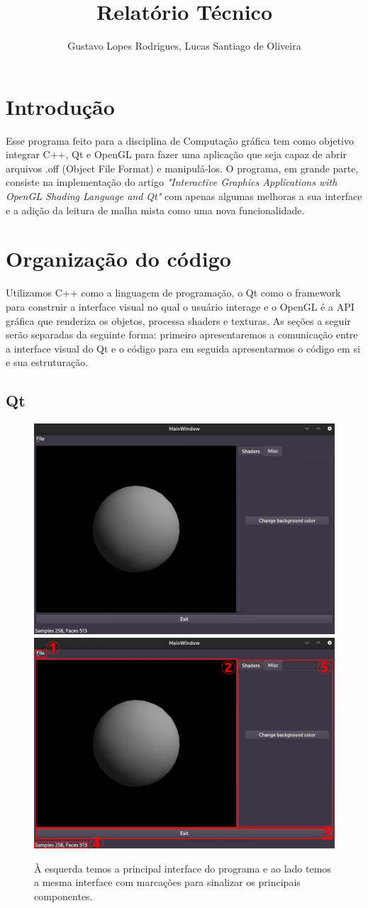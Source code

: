 \documentclass{ol-softwaremanual}
\title{Relatório Técnico }
\author{Gustavo Lopes Rodrigues, Lucas Santiago de Oliveira}
\begin{document}
\maketitle

\tableofcontents
\newpage

\section{Introdução}

Esse programa feito para a disciplina de Computação gráfica tem como objetivo integrar
C++, Qt e OpenGL para fazer uma aplicação que seja capaz de abrir arquivos .off (Object File Format)
e manipulá-los. O programa, em grande parte, consiste na implementação do artigo 
\emph{"Interactive Graphics Applications with OpenGL Shading Language and Qt"} com apenas algumas 
melhoras a sua interface e a adição da leitura de malha mista como uma nova funcionalidade.

\section{Organização do código}

Utilizamos C++ como a linguagem de programação, o Qt como o framework para 
construir a interface visual no qual o usuário interage e o OpenGL é a API gráfica que renderiza
os objetos, processa shaders e texturas. As seções a seguir serão separadas da seguinte forma: primeiro
apresentaremos a comunicação entre a interface visual do Qt e o código para em seguida apresentarmos o código 
em si e sua estruturação.

\subsection{Qt}

\begin{figure}[ht]
    \centering
    \includegraphics[width=.4\textwidth]{Interface.jpg}
    \includegraphics[width=.4\textwidth]{Interfacemarcada.jpg}
    \caption{À esquerda temos a principal interface do programa e ao lado temos a mesma interface
    com marcações para sinalizar os principais componentes.}
\end{figure}
\end{document}
